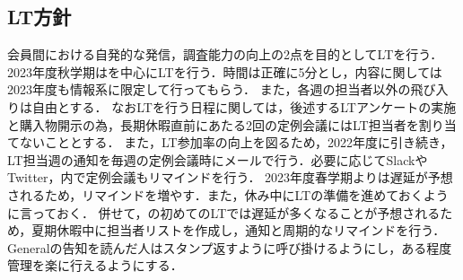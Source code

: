 
\subsection*{LT方針}


会員間における自発的な発信，調査能力の向上の2点を目的としてLTを行う．
2023年度秋学期は\firstGrade{}を中心にLTを行う．時間は正確に5分とし，内容に関しては2023年度も情報系に限定して行ってもらう．
また，各週の担当者以外の飛び入りは自由とする．
なおLTを行う日程に関しては，後述するLTアンケートの実施と購入物開示の為，長期休暇直前にあたる2回の定例会議にはLT担当者を割り当てないこととする．
また，LT参加率の向上を図るため，2022年度に引き続き，LT担当週の通知を毎週の定例会議時にメールで行う．必要に応じてSlackやTwitter，内で定例会議もリマインドを行う．
2023年度春学期よりは遅延が予想されるため，リマインドを増やす．また，休み中にLTの準備を進めておくように言っておく．
併せて，\firstGrade{}の初めてのLTでは遅延が多くなることが予想されるため，夏期休暇中に担当者リストを作成し，通知と周期的なリマインドを行う．
Generalの告知を読んだ人はスタンプ返すように呼び掛けるようにし，ある程度管理を楽に行えるようにする．
